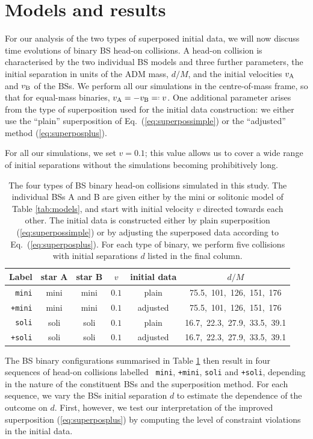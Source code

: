 \documentclass[]{iopart}
\newcommand*{\invdefeq}{=\mathrel{\vcenter{\baselineskip0.5ex \lineskiplimit0pt
                     \hbox{\scriptsize.}\hbox{\scriptsize.}}}%
                     }
\begin{document}
\section{Models and results}
\label{sec:results}
%
For our analysis of the two types of superposed initial data, we
will now discuss time evolutions of binary BS head-on collisions.
A head-on collision is characterised by the two individual BS models
and three further parameters, the initial separation in units of
the ADM mass, $d/M$, and the initial velocities $v_{\rm A}$ and
$v_{\rm B}$ of the BSs. We perform all our simulations in the
centre-of-mass frame, so that for equal-mass binaries, $v_{\rm
A}=-v_{\rm B}\invdefeq v$.  One additional parameter arises from
the type of superposition used for the initial data construction:
we either use the ``plain'' superposition of Eq.~(\ref{eq:superpossimple})
or the ``adjusted'' method (\ref{eq:superposplus}).

For all our simulations, we set $v=0.1$; this value allows us to
cover a wide range of initial separations without the simulations
becoming prohibitively long.
%
\begin{table}[t]
    \centering
    \caption{
    The four types of BS binary head-on collisions simulated in
    this study. The individual BSs A and B are given either by the
    mini or solitonic model of Table \ref{tab:models}, and start
    with initial velocity $v$ directed towards each other. The
    initial data is constructed either by plain superposition
    (\ref{eq:superpossimple}) or by adjusting the superposed data
    according to Eq.~(\ref{eq:superposplus}).  For each type of
    binary, we perform five collisions with initial separations $d$
    listed in the final column.
    }
    \begin{tabular}{r|ccccc}
    \hline
    Label & star A & star B & $v$ & initial data & $d/M$ \\
    \hline
    {\tt mini} & mini & mini & $0.1$ & plain &
    75.5,~101,~126,~151,~176 \\
    {\tt +mini}& mini & mini & $0.1$ & adjusted &
    75.5,~101,~126,~151,~176 \\
    {\tt soli} & soli & soli & $0.1$ & plain &
    16.7,~22.3,~27.9,~33.5,~39.1 \\
    {\tt +soli} & soli & soli & $0.1$ &
    adjusted &
    16.7,~22.3,~27.9,~33.5,~39.1 \\
    \hline
    \end{tabular}
    \label{tab:hods}
\end{table}
%
The BS binary configurations summarised in Table \ref{tab:hods}
then result in four sequences of head-on collisions labelled {\tt
mini}, {\tt +mini}, {\tt soli} and {\tt +soli}, depending in the
nature of the constituent BSs and the superposition method. For
each sequence, we vary the BSs initial separation $d$ to estimate
the dependence of the outcome on $d$. First, however, we test our
interpretation of the improved superposition (\ref{eq:superposplus})
by computing the level of constraint violations in the initial data.
\end{document}
